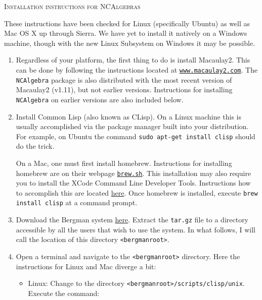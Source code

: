 \documentclass[10pt]{article}
\begin{document}
\begin{center}\textsc{Installation instructions for NCAlgebras}\end{center}

These instructions have been checked for Linux (specifically Ubuntu) as well as Mac OS X up
through Sierra.  We have yet to install it natively on a Windows machine, though with the new Linux Subsystem
on Windows it may be possible.

\begin{enumerate}

\item Regardless of your platform, the first thing to do is install Macaulay2.  This can be done by following
the instructions located at \href{http://www.macaulay2.com}{\texttt{www.macaulay2.com}}.  The \texttt{NCAlgebra}
package is also distributed with the most recent version of Macaulay2 (v1.11), but not earlier versions.
Instructions for installing \texttt{NCAlgebra} on earlier versions are also included below.

\item Install Common Lisp (also known as CLisp).  On a Linux machine this is usually accomplished via the package manager
built into your distribution.  For example, on Ubuntu the command \texttt{sudo apt-get install clisp} should
do the trick.

On a Mac, one must first install homebrew.  Instructions for installing homebrew are on their webpage \href{https://brew.sh}{\texttt{brew.sh}}.
This installation may also require you to install the XCode Command Line Developer Tools.  Instructions how to accomplish
this are located \href{http://osxdaily.com/2014/02/12/install-command-line-tools-mac-os-x/}{here}.  Once homebrew is installed,
execute \texttt{brew install clisp} at a command prompt.

\item Download the Bergman system \href{http://servus.math.su.se/bergman/}{here}.  Extract the \texttt{tar.gz} file to a directory accessible
by all the users that wish to use the system.  In what follows, I will call the location of this directory \texttt{<bergmanroot>}.

\item Open a terminal and navigate to the \texttt{<bergmanroot>} directory.  Here the instructions for Linux and Mac diverge a bit:
\begin{itemize}
\item Linux: Change to the directory \texttt{<bergmanroot>/scripts/clisp/unix}.  Execute the command:


\end{itemize}
\end{enumerate}
\end{document}
